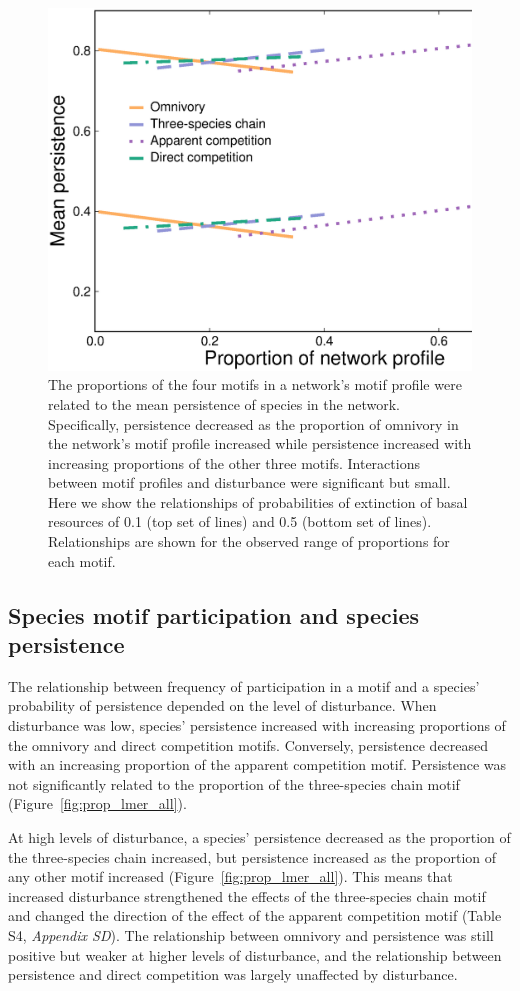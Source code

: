 \documentclass[12pt]{article}
\begin{document}
\begin{spacing}{2.0}
        \begin{figure}
            \centering
            \includegraphics[width=.5\textwidth]{figures/persistence_motif_profiles.eps}
            \caption{The proportions of the four motifs in a network's motif profile were related to the mean persistence of species in the network. Specifically, persistence decreased as the proportion of omnivory in the network's motif profile increased while persistence increased with increasing proportions of the other three motifs. Interactions between motif profiles and disturbance were significant but small. Here we show the relationships of probabilities of extinction of basal resources of 0.1 (top set of lines) and 0.5 (bottom set of lines). Relationships are shown for the observed range of proportions for each motif.}      
            \label{fig:motif_profile_persistence}
        \end{figure}    

    \subsection*{Species motif participation and species persistence} 
    
       The relationship between frequency of participation in a motif and a species' probability of persistence depended on the level of disturbance. 
       When disturbance was low, species' persistence increased with increasing proportions of the omnivory and direct competition motifs. 
       Conversely, persistence decreased with an increasing proportion of the apparent competition motif. 
       Persistence was not significantly related to the proportion of the three-species chain motif (Figure~\ref{fig:prop_lmer_all}).
            
            
        At high levels of disturbance, a species' persistence decreased as the proportion of the three-species chain increased, but persistence increased as the proportion of any other motif increased (Figure~\ref{fig:prop_lmer_all}). 
        This means that increased disturbance strengthened the effects of the three-species chain motif and changed the direction of the effect of the apparent competition motif  (Table S4, \emph{Appendix SD}).
        The relationship between omnivory and persistence was still positive but weaker at higher levels of disturbance, and the relationship between persistence and direct competition was largely unaffected by disturbance.
    

\end{spacing}
\end{document}
